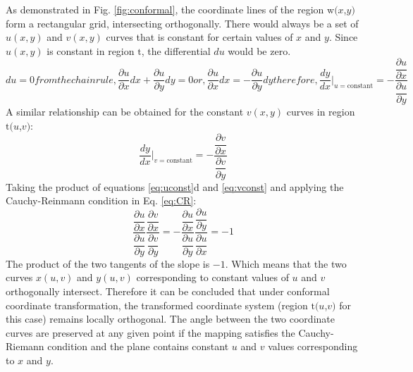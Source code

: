 As demonstrated in Fig. \ref{fig:conformal}, the coordinate lines of the region $\mathrm{w}(x$,$y)$ form a rectangular grid, intersecting orthogonally. There would always be a set of $u(x,y)$ and $v(x,y)$ curves that is constant for certain values of $x$ and $y$. Since $u(x,y)$ is constant in region $\mathrm{t}$, the differential $du$ would be zero. 
\begin{subequations} \label{eq:uconst}
	\begin{equation}
		du = 0 
	\end{equation}  
	from the chain rule, 
	\begin{equation}
		\dfrac{\partial u}{\partial x} dx + \dfrac{\partial u}{\partial y} dy = 0 
	\end{equation}
	or,
	\begin{equation}
		\dfrac{\partial u}{\partial x} dx = - \dfrac{\partial u}{\partial y} dy 
	\end{equation}
	therefore,
	\begin{equation}
		\dfrac{dy}{dx}|_{u=\mathrm{constant}} = - \dfrac{\dfrac{\partial u}{\partial x}}{\dfrac{\partial u}{\partial y}}
	\end{equation}
\end{subequations}
%
A similar relationship can be obtained for the constant $v(x,y)$ curves in region $\mathrm{t}(u$,$v)$:
\begin{equation} \label{eq:vconst}
	\dfrac{dy}{dx}|_{v=\mathrm{constant}} = - \dfrac{\dfrac{\partial v}{\partial x}}{\dfrac{\partial v}{\partial y}}
\end{equation}
Taking the product of equations \ref{eq:uconst}d and \ref{eq:vconst} and applying the Cauchy-Reinmann condition in Eq. \ref{eq:CR}:
%
\begin{equation} \label{eq:cauchy}
	\dfrac{\dfrac{\partial u}{\partial x}}{\dfrac{\partial u}{\partial y}}\dfrac{\dfrac{\partial v}{\partial x}}{\dfrac{\partial v}{\partial y}} = - \dfrac{\dfrac{\partial u}{\partial x}}{\dfrac{\partial u}{\partial y}}\dfrac{\dfrac{\partial u}{\partial y}}{\dfrac{\partial u}{\partial x}} = -1
\end{equation}
The product of the two tangents of the slope is $-1$.  Which means that the two curves $x(u,v)$ and $y(u,v)$ corresponding to constant values of $u$ and $v$ orthogonally intersect. Therefore it can be concluded that under conformal coordinate transformation, the transformed coordinate system (region $\mathrm{t}(u$,$v)$ for this case) remains locally orthogonal. The angle between the two coordinate curves are preserved at any given point if the mapping satisfies the Cauchy-Riemann condition and the plane contains constant $u$ and $v$ values corresponding to $x$ and $y$.
%

